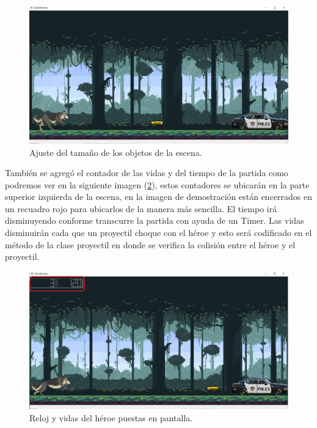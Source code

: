 \documentclass{article}
\begin{document}
\begin{figure}[h]
\includegraphics[scale=0.3]{Images/tamaniobjetosajustado.png}
\centering
\caption{Ajuste del tamaño de los objetos de la escena.}
\label{fig:ajustetamanio}
\end{figure}

También se agregó el contador de las vidas y del tiempo de la partida como podremos ver en la siguiente imagen (\ref{fig:vidastiempo}), estos contadores se ubicarán en la parte superior izquierda de la escena, en la imagen de demostración están encerrados en un recuadro rojo para ubicarlos de la manera más sencilla. El tiempo irá disminuyendo conforme transcurre la partida con ayuda de un Timer. Las vidas disminuirán cada que un proyectil choque con el héroe y esto será codificado en el método de la clase proyectil en donde se verifica la colisión entre el héroe y el proyectil.

\newpage
\begin{figure}[h]
\includegraphics[scale=0.4]{Images/tiempovidas.png}
\centering
\caption{Reloj y vidas del héroe puestas en pantalla.}
\label{fig:vidastiempo}
\end{figure}
\end{document}
